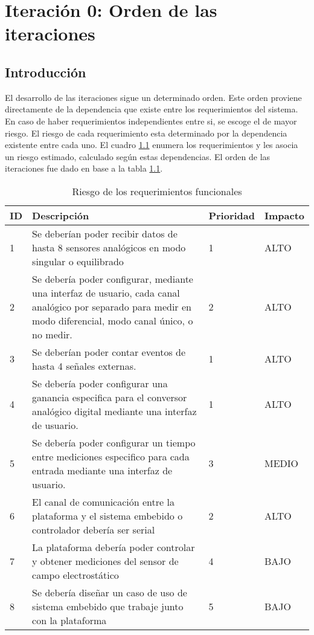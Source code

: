 \chapter{Iteración 0: Orden de las iteraciones} %
\label{cha:iteracion_0}

\section{Introducción} %
\label{it0:sec:introduccion}

El desarrollo de las iteraciones sigue un determinado orden. Este orden proviene directamente de la dependencia que existe entre los requerimientos del sistema. En caso de haber requerimientos independientes entre si, se escoge el de mayor riesgo. El riesgo de cada requerimiento esta determinado por la dependencia existente entre cada uno. El cuadro \ref{tab:riesgoderequerimientos} enumera los requerimientos y les asocia un riesgo estimado, calculado según estas dependencias. El orden de las iteraciones fue dado en base a la tabla \ref{tab:riesgoderequerimientos}.

\begin{table}[ht]
\centering
\caption{Riesgo de los requerimientos funcionales}
\label{tab:riesgoderequerimientos}
\begin{center}
\centering
\begin{tabular}{|p{0.3cm}|p{6cm}|p{1.5cm}|p{1.5cm}|}
\hline
\cellcolor[HTML]{68CBD0}ID & \cellcolor[HTML]{68CBD0}Descripción & \cellcolor[HTML]{68CBD0}Prioridad & \cellcolor[HTML]{68CBD0}Impacto  \\
\hline
1 &  Se deberían poder recibir datos de hasta 8 sensores analógicos en modo singular o equilibrado & 1 & ALTO  \\
\hline
2 &  Se debería poder configurar, mediante una interfaz de usuario, cada canal analógico por separado para medir en modo diferencial, modo canal único, o no medir. & 2 & ALTO  \\
\hline
3 &  Se deberían poder contar eventos de hasta 4 señales externas. & 1 & ALTO  \\
\hline
4 &   Se debería poder configurar una ganancia especifica para el conversor analógico digital mediante una interfaz de usuario. & 1 & ALTO  \\
\hline
5 &  Se debería poder configurar un tiempo entre mediciones especifico para cada entrada mediante una interfaz de usuario. & 3 & MEDIO \\
\hline
6 &   El canal de comunicación entre la plataforma y el sistema embebido o controlador debería ser serial  & 2 & ALTO \\
\hline
7 &  La plataforma debería poder controlar y obtener mediciones del sensor de campo electrostático & 4 & BAJO  \\
\hline
8 &  Se debería diseñar un caso de uso de sistema embebido que trabaje junto con la plataforma & 5 & BAJO  \\
\hline
\end{tabular}
\end{center}
\end{table}

